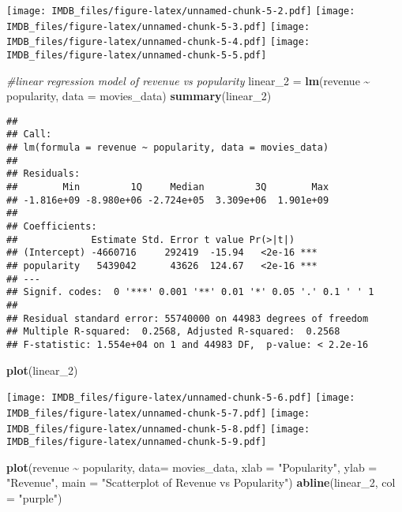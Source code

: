 \documentclass[
]{article}
\newenvironment{Shaded}{\begin{snugshade}}{\end{snugshade}}
\newcommand{\AttributeTok}[1]{\textcolor[rgb]{0.13,0.29,0.53}{#1}}
\newcommand{\CommentTok}[1]{\textcolor[rgb]{0.56,0.35,0.01}{\textit{#1}}}
\newcommand{\FunctionTok}[1]{\textcolor[rgb]{0.13,0.29,0.53}{\textbf{#1}}}
\newcommand{\NormalTok}[1]{#1}
\newcommand{\OtherTok}[1]{\textcolor[rgb]{0.56,0.35,0.01}{#1}}
\newcommand{\SpecialCharTok}[1]{\textcolor[rgb]{0.81,0.36,0.00}{\textbf{#1}}}
\newcommand{\StringTok}[1]{\textcolor[rgb]{0.31,0.60,0.02}{#1}}
\begin{document}
\texttt{[image: IMDB\_files/figure-latex/unnamed-chunk-5-2.pdf]}
\texttt{[image: IMDB\_files/figure-latex/unnamed-chunk-5-3.pdf]}
\texttt{[image: IMDB\_files/figure-latex/unnamed-chunk-5-4.pdf]}
\texttt{[image: IMDB\_files/figure-latex/unnamed-chunk-5-5.pdf]}

\begin{Shaded}
\begin{Highlighting}[]
\CommentTok{\#linear regression model of revenue vs popularity}
\NormalTok{linear\_2 }\OtherTok{=} \FunctionTok{lm}\NormalTok{(revenue }\SpecialCharTok{\textasciitilde{}}\NormalTok{ popularity, }\AttributeTok{data =}\NormalTok{ movies\_data)}
\FunctionTok{summary}\NormalTok{(linear\_2)}
\end{Highlighting}
\end{Shaded}

\begin{verbatim}
## 
## Call:
## lm(formula = revenue ~ popularity, data = movies_data)
## 
## Residuals:
##        Min         1Q     Median         3Q        Max 
## -1.816e+09 -8.980e+06 -2.724e+05  3.309e+06  1.901e+09 
## 
## Coefficients:
##             Estimate Std. Error t value Pr(>|t|)    
## (Intercept) -4660716     292419  -15.94   <2e-16 ***
## popularity   5439042      43626  124.67   <2e-16 ***
## ---
## Signif. codes:  0 '***' 0.001 '**' 0.01 '*' 0.05 '.' 0.1 ' ' 1
## 
## Residual standard error: 55740000 on 44983 degrees of freedom
## Multiple R-squared:  0.2568, Adjusted R-squared:  0.2568 
## F-statistic: 1.554e+04 on 1 and 44983 DF,  p-value: < 2.2e-16
\end{verbatim}

\begin{Shaded}
\begin{Highlighting}[]
\FunctionTok{plot}\NormalTok{(linear\_2)}
\end{Highlighting}
\end{Shaded}

\texttt{[image: IMDB\_files/figure-latex/unnamed-chunk-5-6.pdf]}
\texttt{[image: IMDB\_files/figure-latex/unnamed-chunk-5-7.pdf]}
\texttt{[image: IMDB\_files/figure-latex/unnamed-chunk-5-8.pdf]}
\texttt{[image: IMDB\_files/figure-latex/unnamed-chunk-5-9.pdf]}

\begin{Shaded}
\begin{Highlighting}[]
\FunctionTok{plot}\NormalTok{(revenue }\SpecialCharTok{\textasciitilde{}}\NormalTok{ popularity, }\AttributeTok{data=}\NormalTok{ movies\_data, }\AttributeTok{xlab =} \StringTok{"Popularity"}\NormalTok{, }\AttributeTok{ylab =} \StringTok{"Revenue"}\NormalTok{, }\AttributeTok{main =} \StringTok{"Scatterplot of Revenue vs Popularity"}\NormalTok{)}
\FunctionTok{abline}\NormalTok{(linear\_2, }\AttributeTok{col =} \StringTok{"purple"}\NormalTok{)}
\end{Highlighting}
\end{Shaded}
\end{document}
